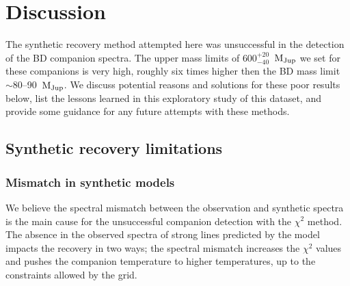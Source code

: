 \documentclass[fleqn,usenatbib]{mnras}
\newcommand*\bl{\color{blue}}
\begin{document}
    
    \section{Discussion}
    \label{sec:discussion}
    {\bl The synthetic recovery method attempted here was unsuccessful in the detection of the BD companion spectra.} The upper mass limits of \(600^{+20}_{-40}\)~\(\rm M_{Jup}\) we set for these companions is very high, roughly six times higher then the BD mass limit \(\sim\)80--90~\(\rm M_{Jup}\).
    We discuss potential reasons and solutions for these poor results below, list the lessons learned in this exploratory study {\bl of this dataset}, and provide some guidance for any future attempts with these methods.
    
    \subsection{Synthetic recovery limitations}
    \label{subsec:limitations}
    
    \subsubsection{Mismatch in synthetic models}
    \label{subsubsec:mismatch}
    We believe the spectral mismatch between the observation and synthetic spectra is the main cause for the unsuccessful companion detection with the $\chi^2$ method. {\bl The absence in the observed spectra of strong lines predicted by the model impacts the recovery in two ways; the spectral mismatch increases the \(\chi^2\) values and pushes the companion temperature to higher temperatures, up to the constraints allowed by the grid.}
    
\end{document}
